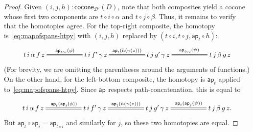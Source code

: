 \documentclass[10pt,a4paper]{article}
\newcommand{\mapfunc}[1]{\ensuremath{\mathsf{ap}_{#1}}\xspace} %
\let\apfunc\mapfunc
\newcommand{\cocone}[2]{\mathsf{cocone}_{#1}(#2)}
\newcommand{\Ddiag}{\mathscr{D}}
\theoremstyle{definition}
\theoremstyle{remark}
\numberwithin{equation}{section}
\begin{document}
\begin{proof}
  Given $(i,j,h):\cocone{\Ddiag'}{D}$, note that both composites yield a cocone whose first two components are $t\circ i\circ \alpha$ and $t\circ j\circ\beta$.
  Thus, it remains to verify that the homotopies agree.
  For the top-right composite, the homotopy is~\eqref{eq:mapofspans-htpy} with $(i,j,h)$ replaced by $(t\circ i, t\circ j, \apfunc{t}\circ h)$:
  \begin{equation*}
    \xymatrix@+2.8em{
      {t \, i \, \alpha \, f \, z} \ar@{=}[r]^{\apfunc{t\circ i}(\phi)} &
      {t \, i \, f' \, \gamma \, z} \ar@{=}[r]^{\apfunc{t}(h(\gamma(z)))} &
      {t \, j \, g' \, \gamma \, z} \ar@{=}[r]^{\apfunc{t\circ j}(\psi)} &
      {t \, j \, \beta \, g \, z}
    }
  \end{equation*}
  (For brevity, we are omitting the parentheses around the arguments of functions.)
  On the other hand, for the left-bottom composite, the homotopy is $\apfunc{t}$ applied to~\eqref{eq:mapofspans-htpy}.
  Since $\apfunc{}$ respects path-concatenation, this is equal to
  \begin{equation*}
    \xymatrix@+2.8em{
      {t \, i \, \alpha \, f \, z} \ar@{=}[r]^{\apfunc{t}(\apfunc{i}(\phi))} &
      {t \, i \, f' \, \gamma \, z} \ar@{=}[r]^{\apfunc{t}(h(\gamma(z)))} &
      {t \, j \, g' \, \gamma \, z} \ar@{=}[r]^{\apfunc{t}(\apfunc{j}(\psi))} &
      {t \, j \, \beta \, g \, z}. }
  \end{equation*}
  But $\apfunc{t}\circ \apfunc{i} = \apfunc{t\circ i}$ and similarly for $j$, so these two homotopies are equal.
\end{proof}
\end{document}
